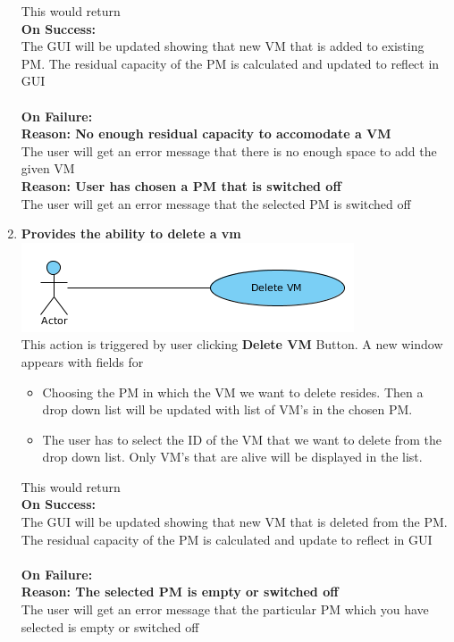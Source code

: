 \documentclass[a4paper,11pt]{article}
\begin{document}
\begin{enumerate}
				This would return \\
				{\bf On Success: }\\
				The GUI will be updated showing that new  VM that is added to existing PM.
				The residual capacity of the PM is calculated and updated to reflect in GUI\\\\
				{\bf On Failure: } \\
				{\bf Reason: No enough residual capacity to accomodate a VM}\\
				The user will get an error message that there is no enough space to add the given VM\\
				{\bf Reason: User has chosen a PM that is switched off}\\
				The user will get an error message that the selected PM is switched off
				\item {\bf Provides the ability to delete a vm}\\
				\includegraphics{images/delete}
				\\This action is triggered by user clicking {\bf Delete VM } Button. A new window appears with fields for  
				\begin{itemize}
				 \item Choosing the PM in which the VM we want to delete resides. Then a drop down list will be
				 updated with list of VM's in the chosen PM.
				 \item The user has to select the  ID of the VM that we want to delete from the drop down list. Only VM's that are alive will be displayed in the list.
				\end{itemize}
				
				This would return \\
				{\bf On Success: }\\
				The GUI will be updated showing that new  VM that is deleted from the PM.
				The residual capacity of the PM is calculated and update to reflect in GUI\\\\
				{\bf On Failure: } \\
				{\bf Reason: The selected PM is empty or switched off}\\
				The user will get an error message that the particular PM which you have selected is empty or 
				switched off
				

\end{enumerate}
\end{document}
